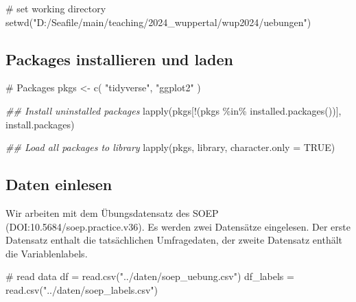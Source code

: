 \documentclass[
  letterpaper,
  DIV=11,
  numbers=noendperiod]{scrartcl}
\newenvironment{Shaded}{\begin{snugshade}}{\end{snugshade}}
\newcommand{\AttributeTok}[1]{\textcolor[rgb]{0.40,0.45,0.13}{#1}}
\newcommand{\CommentTok}[1]{\textcolor[rgb]{0.37,0.37,0.37}{#1}}
\newcommand{\ConstantTok}[1]{\textcolor[rgb]{0.56,0.35,0.01}{#1}}
\newcommand{\DocumentationTok}[1]{\textcolor[rgb]{0.37,0.37,0.37}{\textit{#1}}}
\newcommand{\FunctionTok}[1]{\textcolor[rgb]{0.28,0.35,0.67}{#1}}
\newcommand{\NormalTok}[1]{\textcolor[rgb]{0.00,0.23,0.31}{#1}}
\newcommand{\OtherTok}[1]{\textcolor[rgb]{0.00,0.23,0.31}{#1}}
\newcommand{\SpecialCharTok}[1]{\textcolor[rgb]{0.37,0.37,0.37}{#1}}
\newcommand{\StringTok}[1]{\textcolor[rgb]{0.13,0.47,0.30}{#1}}
\begin{document}
\begin{Shaded}
\begin{Highlighting}[]
\CommentTok{\# set working directory}
\FunctionTok{setwd}\NormalTok{(}\StringTok{"D:/Seafile/main/teaching/2024\_wuppertal/wup2024/uebungen"}\NormalTok{)}
\end{Highlighting}
\end{Shaded}

\subsection{Packages installieren und
laden}\label{packages-installieren-und-laden}

\begin{Shaded}
\begin{Highlighting}[]
\CommentTok{\# Packages}
\NormalTok{pkgs }\OtherTok{\textless{}{-}} \FunctionTok{c}\NormalTok{(}
  \StringTok{"tidyverse"}\NormalTok{,}
  \StringTok{"ggplot2"}
\NormalTok{) }

\DocumentationTok{\#\# Install uninstalled packages}
\FunctionTok{lapply}\NormalTok{(pkgs[}\SpecialCharTok{!}\NormalTok{(pkgs }\SpecialCharTok{\%in\%} \FunctionTok{installed.packages}\NormalTok{())], install.packages)}

\DocumentationTok{\#\# Load all packages to library}
\FunctionTok{lapply}\NormalTok{(pkgs, library, }\AttributeTok{character.only =} \ConstantTok{TRUE}\NormalTok{)}
\end{Highlighting}
\end{Shaded}

\subsection{Daten einlesen}\label{daten-einlesen}

Wir arbeiten mit dem Übungsdatensatz des SOEP
(DOI:10.5684/soep.practice.v36). Es werden zwei Datensätze eingelesen.
Der erste Datensatz enthalt die tatsächlichen Umfragedaten, der zweite
Datensatz enthält die Variablenlabels.

\begin{Shaded}
\begin{Highlighting}[]
\CommentTok{\# read data}
\NormalTok{df }\OtherTok{=} \FunctionTok{read.csv}\NormalTok{(}\StringTok{"../daten/soep\_uebung.csv"}\NormalTok{)}
\NormalTok{df\_labels }\OtherTok{=} \FunctionTok{read.csv}\NormalTok{(}\StringTok{"../daten/soep\_labels.csv"}\NormalTok{)}
\end{Highlighting}
\end{Shaded}
\end{document}
